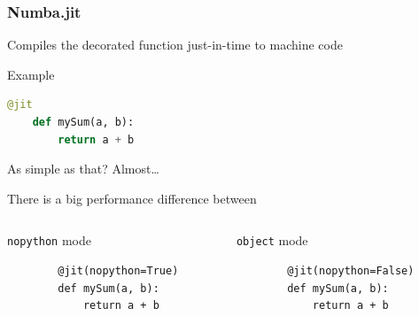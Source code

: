 \documentclass[10pt, aspectratio=1610]{beamer}
\begin{document}
\begin{frame}[fragile]
  \frametitle{Numba.jit}

  Compiles the decorated function just-in-time to machine code

  \vfill

  Example
  \begin{lstlisting}[language=python]
    @jit
    def mySum(a, b):
        return a + b
  \end{lstlisting}

  \vfill

  As simple as that?
  Almost\dots

  \vfill

  There is a big performance difference between

  \vspace{1ex}
  \begin{columns}
    \begin{column}{0.45\textwidth}
      \alert{\texttt{nopython}} mode
      \begin{lstlisting}
        @jit(nopython=True)
        def mySum(a, b):
            return a + b
      \end{lstlisting}
    \end{column}
    \begin{column}{0.45\textwidth}
      \alert{\texttt{object}} mode
      \begin{lstlisting}
        @jit(nopython=False)
        def mySum(a, b):
            return a + b
      \end{lstlisting}
    \end{column}
  \end{columns}

\end{frame}
\end{document}
